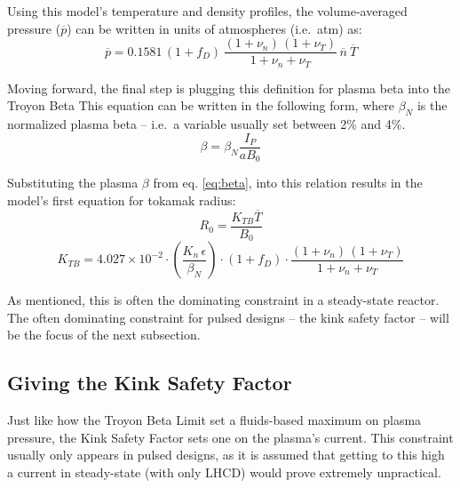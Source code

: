 Using this model's temperature and density profiles, the volume-averaged pressure ($\overline p$) can be written in units of atmospheres (i.e.\ atm) as:
\begin{equation}
  \overline{p} = 0.1581 \, ( 1 + f_D ) \, \frac{ (1 + \nu_n) \, (1 + \nu_T) }{1 + \nu_n + \nu_T } \, \overline{n} \ \overline{T}
\end{equation}

Moving forward, the final step is plugging this definition for plasma beta into the  Troyon Beta  This equation can be written in the following form, where $\beta_N$ is the normalized plasma beta -- i.e.\ a  variable usually set between 2\% and 4\%. \cite{hartmann}
\begin{equation}
	\beta = \beta_N \frac{ I_P }{ a B_0 }
\end{equation}

Substituting the plasma $\beta$ from eq. \ref{eq:beta}, into this relation results in the model's first equation for tokamak radius:
\begin{equation}
  \label{eq:r_beta}
  R_0 = \frac{ K_{TB} \overline{T} }{ B_0 }
\end{equation}
\begin{equation}
  K_{TB} = 4.027 \times 10^{-2} \cdot  \left( \frac{K_n \, \epsilon}{\beta_N} \right) \cdot ( 1 + f_D ) \cdot \frac{ (1 + \nu_n) \, (1 + \nu_T) }{1 + \nu_n + \nu_T }
\end{equation}

As mentioned, this is often the dominating constraint in a steady-state reactor. The often dominating constraint for pulsed designs -- the kink safety factor -- will be the focus of the next subsection.

\subsection{Giving the Kink Safety Factor}

Just like how the Troyon Beta Limit set a fluids-based maximum on plasma pressure, the Kink Safety Factor sets one on the plasma's current. This constraint usually only appears in pulsed designs, as it is assumed that getting to this high a current in steady-state (with only LHCD) would prove extremely unpractical.

